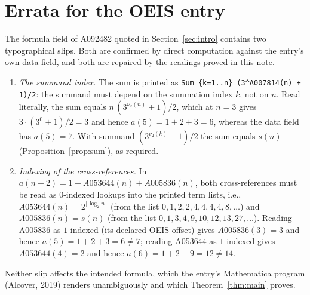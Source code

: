 \documentclass[12pt]{article}
\theoremstyle{plain}
\theoremstyle{definition}
\theoremstyle{remark}
\begin{document}
\appendix

\section{Errata for the OEIS entry}\label{app:errata}

The formula field of A092482 quoted in
Section~\ref{sec:intro} contains two typographical slips.  Both
are confirmed by direct computation against the entry's own data
field, and both are repaired by the readings proved in this note.

\begin{enumerate}
\item \emph{The summand index.}  The sum is printed as
\texttt{Sum\_\{k=1..n\} (3\textasciicircum A007814(n) + 1)/2}:
the summand must depend on the summation index $k$, not on $n$.  Read
literally, the sum equals $n\,(3^{\nu_2(n)}+1)/2$, which at $n=3$
gives $3\cdot(3^0+1)/2=3$ and hence $a(5)=1+2+3=6$, whereas the
data field has $a(5)=7$.  With summand
$(3^{\nu_2(k)}+1)/2$ the sum equals $s(n)$
(Proposition~\ref{prop:sum}), as required.
\item \emph{Indexing of the cross-references.}  In
$a(n+2)=1+A053644(n)+A005836(n)$, both cross-references must be
read as $0$-indexed lookups into the printed term lists, i.e.,
$A053644(n)=2^{\lfloor\log_2 n\rfloor}$ (from the list
$0,1,2,2,4,4,4,4,8,\ldots$) and $A005836(n)=s(n)$ (from the list
$0,1,3,4,9,10,12,13,27,\ldots$).  Reading A005836 as $1$-indexed
(its declared OEIS offset) gives $A005836(3)=3$ and hence
$a(5)=1+2+3=6\neq 7$; reading A053644 as $1$-indexed gives
$A053644(4)=2$ and hence $a(6)=1+2+9=12\neq 14$.
\end{enumerate}

\noindent Neither slip affects the intended formula, which the
entry's Mathematica program (Alcover, 2019) renders unambiguously
and which Theorem~\ref{thm:main} proves.
\end{document}

